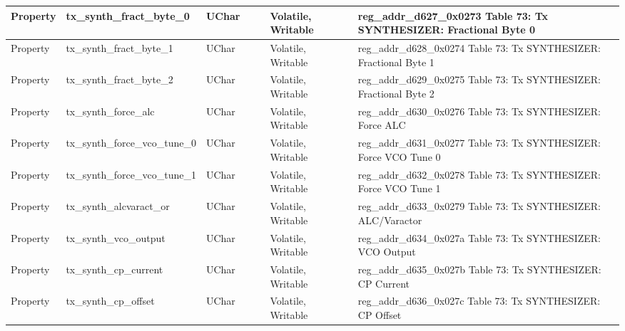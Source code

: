 \documentclass{article}
\begin{document}
\begin{scriptsize}
\begin{longtable}{|p{2cm}|p{5cm}|p{1cm}|p{2cm}|p{2cm}|p{1.75cm}|p{1.5cm}|p{5.1cm}|}
  \hline
  Property & tx\_synth\_fract\_byte\_0                                & UChar &                  &                  & Volatile,  Writable &         & reg\_addr\_d627\_0x0273 Table 73: Tx SYNTHESIZER: Fractional Byte 0 \\
  \hline
  Property & tx\_synth\_fract\_byte\_1                                & UChar &                  &                  & Volatile,  Writable &         & reg\_addr\_d628\_0x0274 Table 73: Tx SYNTHESIZER: Fractional Byte 1 \\
  \hline
  Property & tx\_synth\_fract\_byte\_2                                & UChar &                  &                  & Volatile,  Writable &         & reg\_addr\_d629\_0x0275 Table 73: Tx SYNTHESIZER: Fractional Byte 2 \\
  \hline
  Property & tx\_synth\_force\_alc                                    & UChar &                  &                  & Volatile,  Writable &         & reg\_addr\_d630\_0x0276 Table 73: Tx SYNTHESIZER: Force ALC \\
  \hline
  Property & tx\_synth\_force\_vco\_tune\_0                           & UChar &                  &                  & Volatile,  Writable &         & reg\_addr\_d631\_0x0277 Table 73: Tx SYNTHESIZER: Force VCO Tune 0 \\
  \hline
  Property & tx\_synth\_force\_vco\_tune\_1                           & UChar &                  &                  & Volatile,  Writable &         & reg\_addr\_d632\_0x0278 Table 73: Tx SYNTHESIZER: Force VCO Tune 1 \\
  \hline
  Property & tx\_synth\_alcvaract\_or                                 & UChar &                  &                  & Volatile,  Writable &         & reg\_addr\_d633\_0x0279 Table 73: Tx SYNTHESIZER: ALC/Varactor \\
  \hline
  Property & tx\_synth\_vco\_output                                   & UChar &                  &                  & Volatile,  Writable &         & reg\_addr\_d634\_0x027a Table 73: Tx SYNTHESIZER: VCO Output \\
  \hline
  Property & tx\_synth\_cp\_current                                   & UChar &                  &                  & Volatile,  Writable &         & reg\_addr\_d635\_0x027b Table 73: Tx SYNTHESIZER: CP Current \\
  \hline
  Property & tx\_synth\_cp\_offset                                    & UChar &                  &                  & Volatile,  Writable &         & reg\_addr\_d636\_0x027c Table 73: Tx SYNTHESIZER: CP Offset \\

\end{longtable}
\end{scriptsize}
\end{document}
